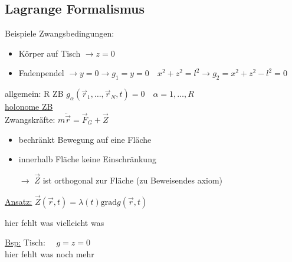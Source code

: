 \documentclass[titlepage,12pt,a4paper,ngerman]{report}
\newcommand{\tx}[1]{\textrm{#1}}
\newcommand{\grad}{\tx{grad}}
\begin{document}
\subsection*{Lagrange Formalismus }
Beispiele Zwangsbedingungen:
\begin{itemize}
	\item Körper auf Tisch $ \rightarrow z = 0 $
	\item Fadenpendel $ \rightarrow y = 0 \rightarrow g_1 = y = 0 \quad x^2 + z^2 = l^2 \rightarrow g_2 = x^2 + z^2 - l^2 = 0 $
\end{itemize}
allgemein: R ZB $ g_\alpha ( \vec{r}_1, \dots , \vec{r}_N,t) = 0 \quad \alpha = 1,\dots,R $ \\
\underline{ holonome ZB }\\
Zwangskräfte: $ m\ddot{\vec{r}} = \vec{F}_G + \vec{Z} $\\
\begin{itemize}
	\item bechränkt Bewegung auf eine Fläche
	\item innerhalb Fläche keine Einschränkung
	\item[$ \rightarrow $] $ \vec{Z} $ ist orthogonal zur Fläche (zu Beweisendes axiom)
\end{itemize}
\underline{Ansatz:} $ \vec{Z}(\vec{r},t) = \lambda(t) \grad g(\vec{r},t) $

hier fehlt was vielleicht was

\underline{Bsp:} Tisch: $  \quad g = z = 0 $\\

hier fehlt was noch mehr

\end{document}
